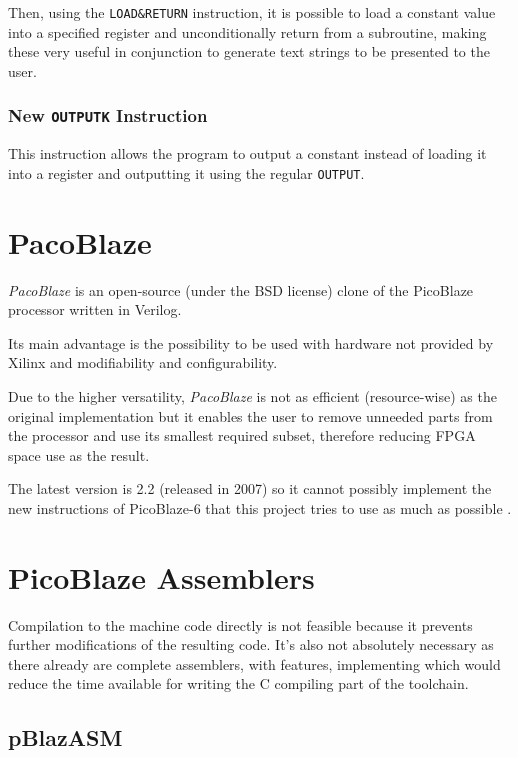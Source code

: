         Then, using the \texttt{LOAD\&RETURN} instruction, it is possible to load a constant value into a specified register and unconditionally return from a subroutine, making these very useful in conjunction to generate text strings to be presented to the user.

        \subsubsection{New \texttt{OUTPUTK} Instruction}

        This instruction allows the program to output a constant instead of loading it into a register and outputting it using the regular \texttt{OUTPUT}.

    \section{PacoBlaze}

    \emph{PacoBlaze} is an open-source (under the BSD license) clone of the PicoBlaze processor written in Verilog.

    Its main advantage is the possibility to be used with hardware not provided by Xilinx and modifiability and configurability. 

    Due to the higher versatility, \emph{PacoBlaze} is not as efficient (resource-wise) as the original implementation but it enables the user to remove unneeded parts from the processor and use its smallest required subset, therefore reducing FPGA space use as the result.

    The latest version is 2.2 (released in 2007) so it cannot possibly implement the new instructions of PicoBlaze-6 that this project tries to use as much as possible \cite{PacoBlaze}.

    \section{PicoBlaze Assemblers}

        Compilation to the machine code directly is not feasible because it prevents further modifications of the resulting code. It's also not absolutely necessary as there already are complete assemblers, with features, implementing which would reduce the time available for writing the C compiling part of the toolchain.

        \subsection{pBlazASM}\label{pblazasm}


